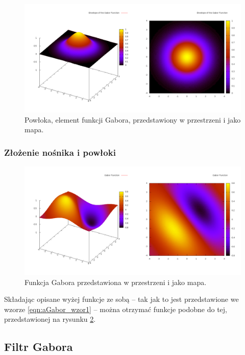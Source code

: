 \begin{figure}[ht]
	\centering
	\includegraphics[width=1\textwidth]{images/envelope.png}
	\caption{Powłoka, element funkcji Gabora, przedstawiony w przestrzeni i jako mapa.}
	\label{fig:aGabor_envelope}
\end{figure}

\subsubsection{Złożenie nośnika i powłoki}
\label{aGabor_zlozenie}

\begin{figure}[ht]
	\centering
	\includegraphics[width=1\textwidth]{images/gaborFunction.png}
	\caption{Funkcja Gabora przedstawiona w przestrzeni i jako mapa.}
	\label{fig:aGabor_function_res}
\end{figure}

Składając opisane wyżej funkcje ze sobą -- tak jak to jest przedstawione we wzorze \ref{eqn:aGabor_wzor1} -- można otrzymać funkcje podobne do tej, przedstawionej na rysunku \ref{fig:aGabor_function_res}.

\subsection{Filtr Gabora}
\label{aGabor_filtr}

